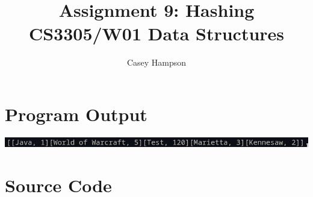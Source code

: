 \documentclass{article}
\title{Assignment 9: Hashing \\[8pt] CS3305/W01 Data Structures}
\author{Casey Hampson}
\begin{document}
\maketitle

\section*{Program Output}
\begin{center}
\includegraphics[width=0.9\linewidth]{./res/1.png}
\end{center}


\pagebreak
\section*{Source Code}
\inputminted{java}{./A9.java}
\end{document}
